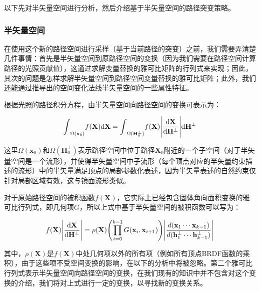 以下先对半矢量空间进行分析，然后介绍基于半矢量空间的路径突变策略。





\subsubsection{半矢量空间}\label{sec:mlt-half-vector-space}
在使用这个新的路径空间进行采样（基于当前路径的突变）之前，我们需要弄清楚几件事情：首先是半矢量空间到原路径空间的变换（因为我们需要在路径空间计算路径的光照贡献值），这通过求解变量替换的雅可比矩阵的行列式来实现；因此，其次的问题是怎样求解半矢量空间到路径空间变量替换的雅可比矩阵；此外，我们还能通过推导出的空间变化法线半矢量空间的一些属性特征。

根据光照的路径积分方程，由半矢量空间向路径空间的变换可表示为：

\begin{equation}
	{\rm \int}_{\Omega(\mathbf{x}_0)}f(\mathbf{X}){\rm d}\mathbf{X}={\rm \int}_{\Omega(\mathbf{H}^{\perp}_{0})}f(\mathbf{X})\Bigg|\frac{{\rm d}\mathbf{X}}{{\rm d}\mathbf{H}^{\perp}}\Bigg| {\rm d}\mathbf{H}^{\perp}
\end{equation}

\noindent 这里$\Omega(\mathbf{x}_0)$和$\Omega(\mathbf{H}^{\perp}_{0})$表示路径空间中位于路径$\mathbf{X}_0$附近的一个子空间（对于半矢量空间是一个流形），并使得半矢量空间中子流形（每个顶点对应的半矢量约束描述的流形）中的半矢量满足顶点的局部参数化表述，因为半矢量表述的自然约束仅针对局部区域有效，这与镜面流形类似。

对于原始路径空间的被积函数$f(\mathbf{X})$，它实际上已经包含固体角向面积变换的雅可比行列式，即几何项$G$，所以上式中基于半矢量空间的被积函数可以写为：

\begin{equation}\label{e:mlt-change-of-variables}
	f(\mathbf{X})\Bigg|\frac{{\rm d}\mathbf{X}}{{\rm d}\mathbf{H}^{\perp}}\Bigg|=\rho(\mathbf{X})\Biggl(\prod^{k-1}_{i=0}G(\mathbf{x}_i,\mathbf{x}_{i+1})\Biggl)\Bigg|\frac{d(\mathbf{x}_1\cdots\mathbf{x}_{k-1})}{d(\mathbf{h}^{\perp}_1\cdots\mathbf{h}^{\perp}_{k-1})}\Bigg|
\end{equation}

\noindent 其中，$\rho(\mathbf{X})$是$f(\mathbf{X})$中处几何项以外的所有项（例如所有顶点BRDF函数的乘积），由于这些项不受空间变换的影响，在以下的分析中将被忽略。第二个雅可比行列式表示半矢量空间向路径空间的变换，在我们现有的知识中并不包含对这个变换的介绍，我们将对上式进行一定的变换，以寻找新的变换关系。

